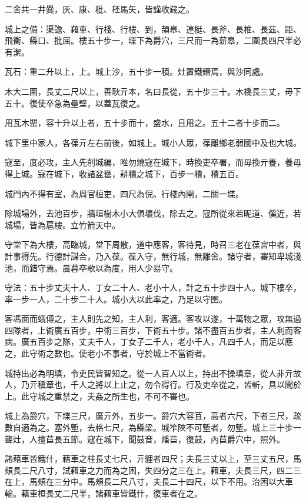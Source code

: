 \begin{pinyinscope}
二舍共一井爨，灰、康、秕、秠馬矢，皆謹收藏之。

城上之備：渠譫、藉車、行棧、行樓、到，頡皋、連梃、長斧、長椎、長茲、距、飛衝、縣口、批屈。樓五十步一，堞下為爵穴，三尺而一為薪皋，二圍長四尺半必有潔。

瓦石：重二升以上，上。城上沙，五十步一積。灶置鐵鐕焉，與沙同處。

木大二圍，長丈二尺以上，善耿亓本，名曰長從，五十步三十。木橋長三丈，毋下五十。復使卒急為壘壁，以蓋瓦復之。

用瓦木罌，容十升以上者，五十步而十，盛水，且用之。五十二者十步而二。

城下里中家人，各葆亓左右前後，如城上。城小人眾，葆離鄉老弱國中及也大城。

寇至，度必攻，主人先削城編，唯勿燒寇在城下，時換吏卒署，而毋換亓養，養毋得上城。寇在城下，收諸盆罋，耕積之城下，百步一積，積五百。

城門內不得有室，為周官桓吏，四尺為倪。行棧內閈，二關一堞。

除城場外，去池百步，牆垣樹木小大俱壞伐，除去之。寇所從來若昵道、傒近，若城場，皆為扈樓。立竹箭天中。

守堂下為大樓，高臨城，堂下周散，道中應客，客待見，時召三老在葆宮中者，與計事得先。行德計謀合，乃入葆。葆入守，無行城，無離舍。諸守者，審知卑城淺池，而錯守焉。晨暮卒歌以為度，用人少易守。

守法：五十步丈夫十人、丁女二十人、老小十人，計之五十步四十人。城下樓卒，率一步一人，二十步二十人。城小大以此率之，乃足以守圉。

客馮面而蛾傅之，主人則先之知，主人利，客適。客攻以遂，十萬物之眾，攻無過四隊者，上術廣五百步，中術三百步，下術五十步。諸不盡百五步者，主人利而客病。廣五百步之隊，丈夫千人，丁女子二千人，老小千人，凡四千人，而足以應之，此守術之數也。使老小不事者，守於城上不當術者。

城持出必為明填，令吏民皆智知之。從一人百人以上，持出不操填章，從人非亓故人，乃亓稹章也，千人之將以上止之，勿令得行。行及吏卒從之，皆斬，具以聞於上。此守城之重禁之，夫姦之所生也，不可不審也。

城上為爵穴，下堞三尺，廣亓外，五步一。爵穴大容苴，高者六尺，下者三尺，疏數自適為之。塞外塹，去格七尺，為縣梁。城笮陜不可塹者，勿塹。城上三十步一聾灶，人擅苣長五節。寇在城下，聞鼓音，燔苣，復鼓，內苣爵穴中，照外。

諸藉車皆鐵什，藉車之柱長丈七尺，亓貍者四尺；夫長三丈以上，至三丈五尺，馬頰長二尺八寸，試藉車之力而為之困，失四分之三在上。藉車，夫長三尺，四二三在上，馬頰在三分中。馬頰長二尺八寸，夫長二十四尺，以下不用。治困以大車輪。藉車桓長丈二尺半，諸藉車皆鐵什，復車者在之。


\end{pinyinscope}
